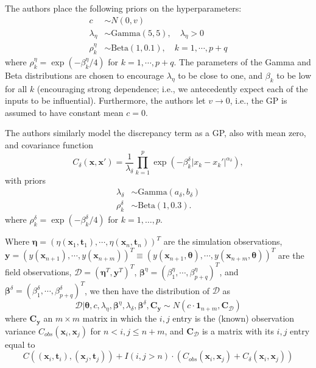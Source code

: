 \documentclass{article}
\begin{document}
The authors place the following priors on the hyperparameters:
\begin{equation}
\begin{aligned}
c&\sim N(0,v)\\
\lambda_\eta&\sim \mathrm{Gamma}(5,5),\quad\lambda_\eta>0\\
\rho_k^\eta &\sim \mathrm{Beta}(1,0.1),\quad k=1,\cdots,p+q
\end{aligned}
\end{equation}
where $\rho_k^\eta=\exp(-\beta_k^\eta/4)$ for $k=1,\cdots,p+q$. The parameters of the Gamma and Beta distributions are chosen to encourage $\lambda_\eta$ to be close to one, and $\beta_k$ to be low for all $k$ (encouraging strong dependence; i.e., we antecedently expect each of the inputs to be influential). Furthermore, the authors let $v\to0$, i.e., the GP is assumed to have constant mean $c=0$.

The authors similarly model the discrepancy term as a GP, also with mean zero, and covariance function
\begin{equation}
C_\delta(\mathbf x,\mathbf x') = \frac 1{\lambda_\delta} \prod_{k=1}^p
\exp\left( -\beta_k^\delta |x_k-x_k'|^{\alpha_\delta} \right),
\end{equation}
with priors
\begin{equation}
\begin{aligned}
\lambda_\delta &\sim \mathrm{Gamma}(a_\delta,b_\delta)\\
\rho^\delta_k &\sim \mathrm{Beta}(1,0.3).
\end{aligned}
\end{equation}
where $\rho_k^\delta=\exp(-\beta_k^\delta/4)$ for $k=1,\ldots,p$.

Where $\boldsymbol \eta = (\eta(\mathbf x_1,\mathbf t_1),\cdots,\eta(\mathbf x_n,\mathbf t_n))^T$ are the simulation observations, $\mathbf y = (y(\mathbf x_{n+1}),\cdots,y(\mathbf x_{n+m}))^T\equiv (y(\mathbf x_{n+1},\boldsymbol\theta),\cdots,y(\mathbf x_{n+m},\boldsymbol\theta))^T$ are the field observations, $\mathcal D = (\boldsymbol \eta^T,\mathbf y^T)^T$, $\boldsymbol \beta^\eta = (\beta^\eta_1,\cdots,\beta_{p+q}^\eta)^T$, and $\boldsymbol \beta^\delta = (\beta^\delta_1,\cdots,\beta_{p+q}^\delta)^T$, we then have the distribution of $\mathcal D$ as 
\begin{equation}
\mathcal D | \boldsymbol \theta,c,\lambda_\eta, \boldsymbol \beta^\eta,\lambda_\delta,\boldsymbol \beta^\delta,\mathbf C_{\mathbf y} \sim N(c \cdot \mathbf 1_{n+m}, \mathbf C_{\mathcal D})
\end{equation}
where $\mathbf C_{\mathbf y}$ an $m\times m$ matrix in which the $i,j$ entry is the (known) observation variance $C_{obs}(\mathbf x_i,\mathbf x_j)$ for $n<i,j\leq n+m$, and $\mathbf C_{\mathcal D}$ is a matrix with its $i,j$ entry equal to
\begin{equation}\label{eq:C_D}
C((\mathbf x_i,\mathbf t_i),(\mathbf x_j,\mathbf t_j)) + I(i,j>n)\cdot(C_{obs}(\mathbf x_i,\mathbf x_j) + C_\delta(\mathbf x_i,\mathbf x_j))
\end{equation}
\end{document}
